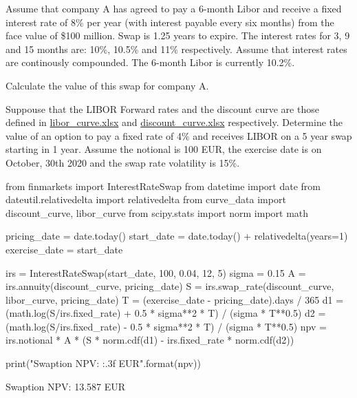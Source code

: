 \begin{question}
Assume that company A has agreed to pay a 6-month Libor and receive a fixed interest rate of 8\% per year (with interest payable every six months) from the face value of \$100 million. Swap is 1.25 years to expire. The interest rates for 3, 9 and 15 months are: 10\%, 10.5\% and 11\% respectively. Assume that interest rates are continously compounded. The 6-month Libor is currently 10.2\%. 

Calculate the value of this swap for company A.
\end{question}

\cprotEnv\begin{solution}
\begin{ipython}

\end{ipython}
\begin{ioutput}

\end{ioutput}
\end{solution}

\begin{question}
Suppouse that the LIBOR Forward rates and the discount curve are those defined in
\href{https://github.com/matteosan1/finance_course/raw/develop/libro/input_files/libor_curve.xlsx}{libor\_curve.xlsx} and \href{https://github.com/matteosan1/finance_course/raw/develop/libro/input_files/discount_curve.xlsx}{discount\_curve.xlsx} respectively.
Determine the value of an option to pay a fixed rate of 4\% and receives LIBOR on a 5 year swap starting in 1 year. Assume the notional is 100 EUR, the exercise date is on October, 30th 2020 and the swap rate volatility is 15\%.
\end{question}

\cprotEnv\begin{solution}
\begin{ipython}
from finmarkets import InterestRateSwap
from datetime import date
from dateutil.relativedelta import relativedelta
from curve_data import discount_curve, libor_curve
from scipy.stats import norm
import math

pricing_date = date.today()
start_date = date.today() + relativedelta(years=1)
exercise_date = start_date

irs = InterestRateSwap(start_date, 100, 0.04, 12, 5)
sigma = 0.15
A = irs.annuity(discount_curve, pricing_date)
S = irs.swap_rate(discount_curve, libor_curve, pricing_date)
T = (exercise_date - pricing_date).days / 365
d1 = (math.log(S/irs.fixed_rate) + 0.5 * sigma**2 * T) / (sigma * T**0.5)
d2 = (math.log(S/irs.fixed_rate) - 0.5 * sigma**2 * T) / (sigma * T**0.5)
npv = irs.notional * A * (S * norm.cdf(d1) - irs.fixed_rate * norm.cdf(d2))

print("Swaption NPV: {:.3f} EUR".format(npv))
\end{ipython}
\begin{ioutput}
Swaption NPV: 13.587 EUR
\end{ioutput}
\end{solution}

